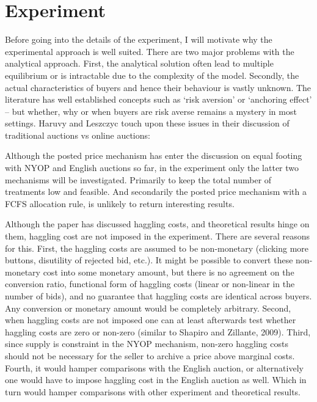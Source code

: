 \documentclass[a4paper,12pt]{article}
\begin{document}
	\section{Experiment}

	Before going into the details of the experiment, I will motivate why the experimental approach is well suited. There are two major problems with the analytical approach. First, the analytical solution often lead to multiple equilibrium or is intractable due to the complexity of the model. Secondly, the actual characteristics of buyers and hence their behaviour is vastly unknown. The literature has well established concepts such as `risk aversion' or `anchoring effect' -- but whether, why or when buyers are risk averse remains a mystery in most settings. Haruvy and Leszczyc touch upon these issues in their discussion of traditional auctions vs online auctions:

Although the posted price mechanism has enter the discussion on equal footing with NYOP and English auctions so far, in the experiment only the latter two mechanisms will be investigated. Primarily to keep the total number of treatments low and feasible. And secondarily the posted price mechanism with a FCFS allocation rule, is unlikely to return interesting results. 

Although the paper has discussed haggling costs, and theoretical results hinge on them, haggling cost are not imposed in the experiment. There are several reasons for this. First, the haggling costs are assumed to be non-monetary (clicking more buttons, disutility of rejected bid, etc.). It might be possible to convert these non-monetary cost into some monetary amount, but there is no agreement on the conversion ratio, functional form of haggling costs (linear or non-linear in the number of bids), and no guarantee that haggling costs are identical across buyers. Any conversion or monetary amount would be completely arbitrary. Second, when haggling costs are not imposed one can at least afterwards test whether haggling costs are zero or non-zero (similar to Shapiro and Zillante, 2009). Third, since supply is constraint in the NYOP mechanism, non-zero haggling costs should not be necessary for the seller to archive a price above marginal costs. Fourth, it would hamper comparisons with the English auction, or alternatively one would have to impose haggling cost in the English auction as well. Which in turn would hamper comparisons with other experiment and theoretical results. 
\end{document}
